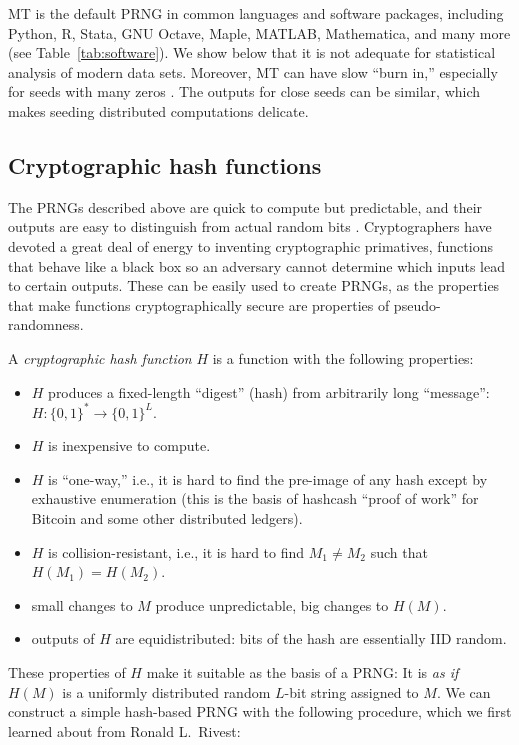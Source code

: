 \documentclass[graybox]{svmult}
\begin{document}
MT is the default PRNG in common languages and software packages, including Python, R, Stata, GNU Octave, Maple, MATLAB, Mathematica, and many more (see Table~\ref{tab:software}).
We show below that it is not adequate for statistical analysis of modern data sets.
Moreover, MT can have slow ``burn in,'' especially for seeds with many zeros \cite{saito_simd-oriented_2008}.
The outputs for close seeds can be similar, which makes seeding distributed computations
delicate.

\subsection{Cryptographic hash functions}
The PRNGs described above are quick to compute but predictable,
and their outputs are easy to distinguish from actual random bits \cite{lecuyer_testu01_2007}.
Cryptographers have devoted a great deal of energy to inventing cryptographic primatives, 
functions that behave like a black box so an adversary cannot determine which inputs lead to certain outputs.
These can be easily used to create PRNGs, as the properties that make functions cryptographically secure
are properties of pseudo-randomness.

A \emph{cryptographic hash function} $H$ is a function with the following properties:

\begin{itemize}
\item $H$ produces a fixed-length ``digest'' (hash) from arbitrarily long ``message'':\\ $H:\{0, 1\}^* \rightarrow \{0, 1\}^L$.
\item $H$ is inexpensive to compute.
\item $H$ is ``one-way,'' i.e., it is hard to find the pre-image of any hash except by exhaustive enumeration (this is the basis of  hashcash ``proof of work'' for Bitcoin and some other distributed ledgers).
\item $H$ is collision-resistant, i.e., it is hard to find $M_1 \ne M_2$ such that $H(M_1) = H(M_2)$.
\item small changes to $M$ produce unpredictable, big changes to $H(M)$.
\item outputs of $H$ are equidistributed: bits of the hash are essentially IID random.
\end{itemize}

These properties of $H$ make it suitable as the basis of a PRNG:
It is \emph{as if} $H(M)$ is a uniformly distributed random $L$-bit string assigned to $M$.
We can construct a simple hash-based PRNG with the following procedure, which we first learned about
from Ronald L.~Rivest:
\end{document}
